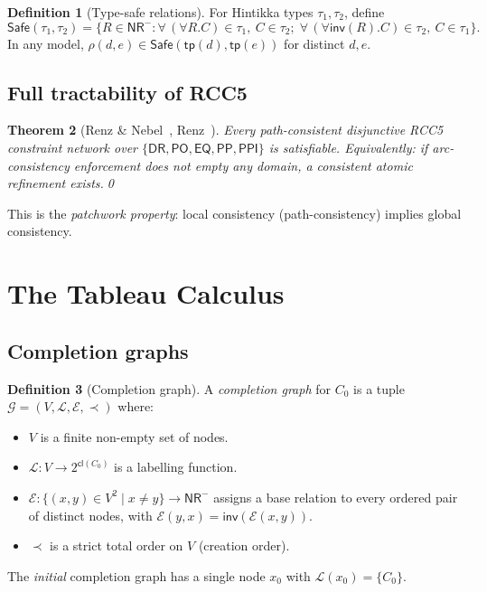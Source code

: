 \documentclass[a4paper,11pt]{article}
\newtheorem{theorem}{Theorem}[section]
\theoremstyle{definition}
\newtheorem{definition}[theorem]{Definition}
\newcommand{\DR}{\ensuremath{\mathsf{DR}}}
\newcommand{\PO}{\ensuremath{\mathsf{PO}}}
\newcommand{\EQ}{\ensuremath{\mathsf{EQ}}}
\newcommand{\PP}{\ensuremath{\mathsf{PP}}}
\newcommand{\PPI}{\ensuremath{\mathsf{PPI}}}
\newcommand{\inv}{\ensuremath{\mathsf{inv}}}
\newcommand{\cl}{\ensuremath{\mathsf{cl}}}
\newcommand{\tp}{\ensuremath{\mathsf{tp}}}
\newcommand{\NR}{\ensuremath{\mathsf{NR}}}
\newcommand{\Safe}{\ensuremath{\mathsf{Safe}}}
\newcommand{\GG}{\ensuremath{\mathcal{G}}}
\newcommand{\LL}{\ensuremath{\mathcal{L}}}
\newcommand{\EE}{\ensuremath{\mathcal{E}}}
\begin{document}
\begin{definition}[Type-safe relations]\label{def:safe}
For Hintikka types $\tau_1, \tau_2$, define
\[
\Safe(\tau_1, \tau_2) = \bigl\{R \in \NR^{-} :
\forall\, (\forall R.C) \in \tau_1,\ C \in \tau_2;\;
\forall\, (\forall\inv(R).C) \in \tau_2,\ C \in \tau_1
\bigr\}.
\]
In any model, $\rho(d, e) \in \Safe(\tp(d), \tp(e))$ for
distinct $d, e$.
\end{definition}

\subsection{Full tractability of RCC5}

\begin{theorem}[Renz \& Nebel~\protect\cite{RenzNebel1999},
Renz~\protect\cite{Renz1999}]\label{thm:patchwork}
Every path-consistent disjunctive RCC5 constraint network
over $\{\DR, \PO, \EQ, \PP, \PPI\}$ is satisfiable.
Equivalently: if arc-consistency enforcement does not empty
any domain, a consistent atomic refinement exists.\qed
\end{theorem}

This is the \emph{patchwork property}: local consistency
(path-consistency) implies global consistency.


\section{The Tableau Calculus}\label{sec:tableau}

\subsection{Completion graphs}

\begin{definition}[Completion graph]\label{def:cg}
A \emph{completion graph} for $C_0$ is a tuple
$\GG = (V, \LL, \EE, \prec)$ where:
\begin{itemize}[nosep]
  \item $V$ is a finite non-empty set of nodes.
  \item $\LL: V \to 2^{\cl(C_0)}$ is a labelling function.
  \item $\EE: \{(x,y) \in V^2 \mid x \neq y\}
    \to \NR^{-}$ assigns a base relation to every ordered pair
    of distinct nodes, with $\EE(y,x) = \inv(\EE(x,y))$.
  \item $\prec$ is a strict total order on $V$ (creation order).
\end{itemize}
The \emph{initial} completion graph has a single node $x_0$
with $\LL(x_0) = \{C_0\}$.
\end{definition}
\end{document}
